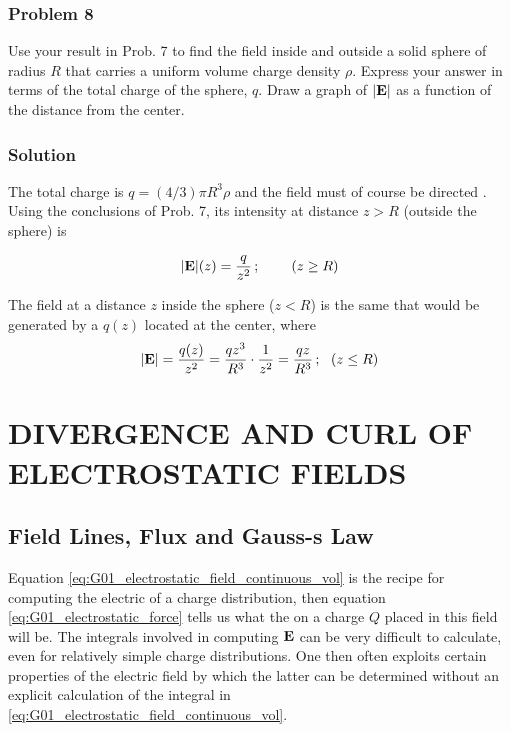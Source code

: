 \subsubsection*{Problem 8}
Use your result in Prob. 7 to find the field inside and outside a solid sphere of radius $R$ that carries a uniform volume charge density $\rho$. Express your answer in terms of the total charge of the sphere, $q$. Draw a graph of $\abs{\vb{E}}$ as a function of the distance from the center.

\subsubsection*{Solution}
The total charge is $q = (4/3) \pi R^3 \rho$ and the field must of course be directed . Using the conclusions of Prob. 7, its intensity at distance $z > R$ (outside the sphere) is 

$$\abs{\vb{E}}(z) = \frac{q}{z^2}\,; \:\:\:\:\:\:\:\:\:\: (z \ge R)$$

The field at a distance $z$ inside the sphere ($z < R$)  is the same that would be generated by a  $q(z)$ located at the center, where 
$$\abs{\vb{E}} = \frac{q(z)}{z^2} = \frac{q z^3}{R^3} \cdot \frac{1}{z^2} = \frac{qz}{R^3}\,; \:\:\: (z \le R)$$ 


\section{DIVERGENCE AND CURL OF ELECTROSTATIC FIELDS}
\subsection{Field Lines, Flux and Gauss-s Law}

Equation \ref{eq:G01_electrostatic_field_continuous_vol} is the recipe for computing the electric  of a charge distribution, then equation \ref{eq:G01_electrostatic_force} tells us what the  on a charge $Q$ placed in this field will be. The integrals involved in computing $\vb{E}$ can be very difficult to calculate, even for relatively simple charge distributions. One then often exploits certain properties of the electric field by which the latter can be determined without an explicit calculation of the integral in \ref{eq:G01_electrostatic_field_continuous_vol}. 

